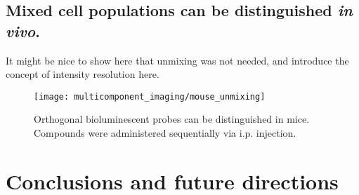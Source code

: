 \subsection{Mixed cell populations can be distinguished \textit{in vivo}.}

\begin{thoughts}
  It might be nice to show here that unmixing was not needed, and introduce the concept of intensity resolution here.
\end{thoughts}

\begin{figure}[htbp]
\texttt{[image: multicomponent\_imaging/mouse\_unmixing]}
\centering
\caption[Orthogonal bioluminescent probes can be distinguished in mice]{
Orthogonal bioluminescent probes can be distinguished in mice.
Compounds were administered sequentially via i.p. injection.
}
  \label{fig:mouse_unmixing}
\end{figure}

\section{Conclusions and future directions}




